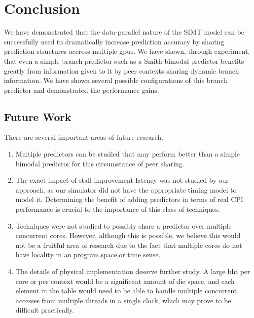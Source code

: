 \documentclass[conference]{IEEEtran}
\begin{document}
\section{Conclusion}
We have demonstrated that the data-parallel nature of the SIMT model can be successfully used to dramatically increase prediction accuracy by sharing prediction structures accross multiple gpus.  We have shown, through experiment, that even
a simple branch predictor such as a Smith bimodal predictor benefits greatly from information given to it by peer contexts sharing dynamic branch information.  We have shown several possible configurations of this branch predictor and demonstrated the performance gains.

\subsection{Future Work}

There are several important areas of future research.

\begin{enumerate}
 \item Multiple predictors can be studied that may perform better than a simple bimodal predictor for this circumstance of peer sharing.
\item The exact impact of stall improvement latency was not studied by our approach, as our simulator did not have the appropriate timing model to model it.  Determining the 
benefit of adding predictors in terms of real CPI performance is crucial to the importance of this class of techniques.
\item Techniques were not studied to possibly share a predictor over multiple concurrent cores.  However, although this is possible, we believe this would not 
be a fruitful area of research due to the fact that multiple cores do not have locality in an program,space,or time sense.
\item The details of physical implementation deserve further study.  A large bht per core or per context would be a significant amount of die space, and each
element in the table would need to be able to handle multiple concurrent accesses from multiple threads in a single clock, which may prove to be difficult practically.
\end{enumerate}



\end{document}
